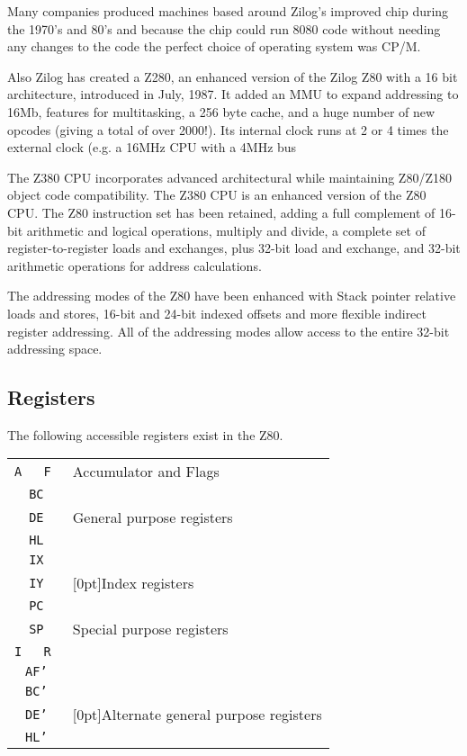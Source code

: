 \documentclass[twoside,openright,a4paper]{book}
\begin{document}
Many companies produced machines based around Zilog's improved chip during the 1970's and 80's and because the chip could run 8080 code without needing any changes to the code the perfect choice of operating system was CP/M. 

Also Zilog has created a Z280, an enhanced version of the Zilog Z80 with a 16 bit architecture, introduced in July, 1987. It added an MMU to expand addressing to 16Mb, features for multitasking, a 256 byte cache, and a huge number of new opcodes (giving a total of over 2000!). Its internal clock runs at 2 or 4 times the external clock (e.g. a 16MHz CPU with a 4MHz bus

The Z380 CPU incorporates advanced architectural while maintaining Z80/Z180 object code compatibility. The Z380 CPU is an enhanced version of the Z80 CPU. The Z80 instruction set has been retained, adding a full complement of 16-bit arithmetic and logical operations, multiply and divide, a complete set of register-to-register loads and exchanges, plus 32-bit load and exchange, and 32-bit arithmetic operations for address calculations.

The addressing modes of the Z80 have been enhanced with Stack pointer relative loads and stores, 16-bit and 24-bit indexed offsets and more flexible indirect register addressing. All of the addressing modes allow access to the entire 32-bit addressing space.


\subsection{Registers}

The following accessible registers exist in the Z80.

\begin{tabular}{|c|c|l}
	\cline{1-2}
	\tt A & \tt F & Accumulator and Flags \\ \cline{1-2} \cline{1-2}
	\multicolumn{2}{|c|}{\tt BC} & \\ \cline{1-2}
	\multicolumn{2}{|c|}{\tt DE} & General purpose registers \\ \cline{1-2}
	\multicolumn{2}{|c|}{\tt HL} & \\ \cline{1-2}
	\multicolumn{2}{|c|}{\tt IX} & \\ \cline{1-2}
	\multicolumn{2}{|c|}{\tt IY} & \raisebox{1.5ex}[0pt]{Index registers} \\ \cline{1-2}
	\multicolumn{2}{|c|}{\tt PC} & \\ \cline{1-2}
	\multicolumn{2}{|c|}{\tt SP} & Special purpose registers \\ \cline{1-2}
	\tt I & \tt R & \\ \cline{1-2}
	\multicolumn{2}{|c|}{\tt AF'} & \\ \cline{1-2}
	\multicolumn{2}{|c|}{\tt BC'} & \\ \cline{1-2}
	\multicolumn{2}{|c|}{\tt DE'} & \raisebox{1.5ex}[0pt]{Alternate general purpose registers}\\ \cline{1-2}
	\multicolumn{2}{|c|}{\tt HL'} & \\ \cline{1-2}
\end{tabular}
\end{document}
